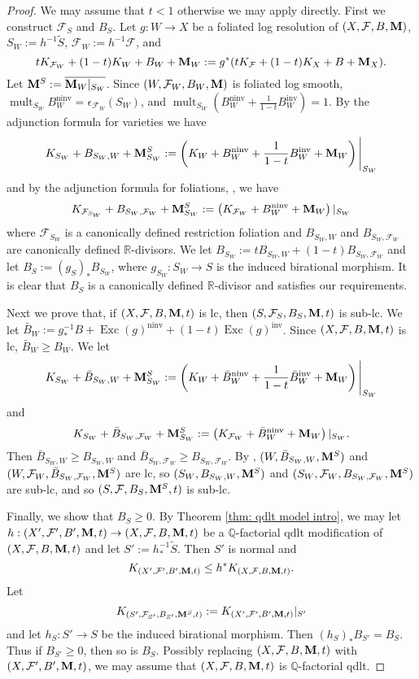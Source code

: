 \documentclass[12pt]{amsart}
\numberwithin{equation}{section}
\newcommand{\Mm}{{\bf{M}}}
\newcommand{\Qq}{\mathbb{Q}}
\newcommand{\Rr}{\mathbb{R}}
\newcommand{\Exc}{\operatorname{Exc}}
\newcommand{\ninv}{\operatorname{ninv}}
\newcommand{\inv}{\operatorname{inv}}
\newcommand{\mult}{\operatorname{mult}}
\newcommand{\Ff}{\mathcal{F}}
\theoremstyle{definition}
\theoremstyle{definition}
\theoremstyle{definition}
\begin{document}
\begin{proof}
We may assume that $t<1$ otherwise we may apply \cite[Theorem 2.4.2]{CHLX23} directly. 
First we construct $\mathcal F_S$ and $B_S$.
Let $g: W\rightarrow X$ be a foliated log resolution of $(X,\Ff,B,\Mm)$, $S_W:=h^{-1}\tilde S$, $\Ff_W:=h^{-1}\Ff$, and 
$$tK_{\Ff_W}+(1-t)K_{W}+B_W+\Mm_{W}:=g^*(tK_{\Ff}+(1-t)K_X+B+\Mm_X).$$
Let $\Mm^S:=\overline{\Mm_{W}|_{S_W}}$. Since $(W,\Ff_W,B_W,\Mm)$ is foliated log smooth, $\mult_{S_W}B_W^{\ninv}=\epsilon_{\Ff_W}(S_W)$, and $\mult_{S_W}(B_W^{\ninv}+\frac{1}{1-t}B_W^{\inv})=1$. By the adjunction formula for varieties we have
$$K_{S_W}+B_{S_W,W}+\Mm^S_{S_W}:=\left(K_{W}+B_W^{\ninv}+\frac{1}{1-t}B_W^{\inv}+\Mm_{W}\right)\Bigg|_{S_W}$$
and by the adjunction formula for foliations, \cite[Proposition-Definition 3.7]{CS23b}, we have
$$K_{\Ff_{S_W}}+B_{S_W,\Ff_W}+\Mm^S_{S_W}:=\left(K_{\Ff_W}+B_W^{\ninv}+\Mm_{W}\right)|_{S_W}$$
where $\Ff_{S_W}$ is a canonically defined restriction foliation and $B_{S_W,W}$ and $B_{S_W,\Ff_W}$ are canonically defined $\Rr$-divisors. We let $B_{S_W}:=tB_{S_W,W}+(1-t)B_{S_W,\Ff_W}$ and let $B_S:=(g_{S})_*B_{S_W}$, where $g_{S_W}: S_W\rightarrow S$ is the induced birational morphism. It is clear that $B_S$ is a canonically defined $\Rr$-divisor and satisfies our requirements.

Next we prove that, if $(X,\Ff,B,\Mm,t)$ is lc, then $(S,\Ff_S,B_S,\Mm,t)$ is sub-lc. We let $\bar B_W:=g^{-1}_*B+\Exc(g)^{
\ninv}+(1-t)\Exc(g)^{\inv}$. Since $(X,\Ff,B,\Mm,t)$ is lc, $\bar B_W\geq B_W$. We let
$$K_{S_W}+\bar B_{S_W,W}+\Mm^S_{S_W}:=\left(K_{W}+\bar B_W^{\ninv}+\frac{1}{1-t}\bar B_W^{\inv}+\Mm_{W}\right)\Bigg|_{S_W}$$
and
$$K_{S_W}+\bar B_{S_W,\Ff_W}+\Mm^S_{S_W}:=\left(K_{\Ff_W}+\bar B_W^{\ninv}+\Mm_{W}\right)|_{S_W}.$$
Then $\bar B_{S_W,W}\geq B_{S_W,W}$ and $\bar B_{S_W,\Ff_W}\geq B_{S_W,\Ff_W}$. By \cite[Theorem 2.4.2]{CHLX23}, $(W,\bar B_{S_W,W},\Mm^S)$ and $(W,\Ff_W,\bar B_{S_W,\Ff_W},\Mm^S)$ are lc, so $(S_W,B_{S_W,W},\Mm^S)$ and $(S_W,\Ff_W,B_{S_W,\Ff_W},\Mm^S)$ are sub-lc, and so $(S,\Ff,B_S,\Mm^S,t)$ is sub-lc.

Finally, we show that $B_S\geq 0$. By Theorem \ref{thm: qdlt model intro}, we may let $h: (X',\Ff',B',\Mm,t)\rightarrow (X,\Ff,B,\Mm,t)$ be a $\Qq$-factorial qdlt modification of $(X,\Ff,B,\Mm,t)$ and let $S':=h^{-1}_*\tilde S$. Then $S'$ is normal and 
$$K_{(X',\Ff',B',\Mm,t)}\leq h^*K_{(X,\Ff,B,\Mm,t)}.$$
Let
$$K_{(S',\Ff_{S'},B_{S'},\Mm^S,t)}:=K_{(X',\Ff',B',\Mm,t)}|_{S'}$$
and let $h_{S}: S'\rightarrow S$ be the induced birational morphism. Then $(h_S)_*B_{S'}=B_S$. Thus if $B_{S'}\geq 0$, then so is $B_S$. Possibly replacing $(X,\Ff,B,\Mm,t)$ with $(X,\Ff',B',\Mm,t)$, we may assume that $(X,\Ff,B,\Mm,t)$ is $\Qq$-factorial qdlt.



\end{proof}
\end{document}
